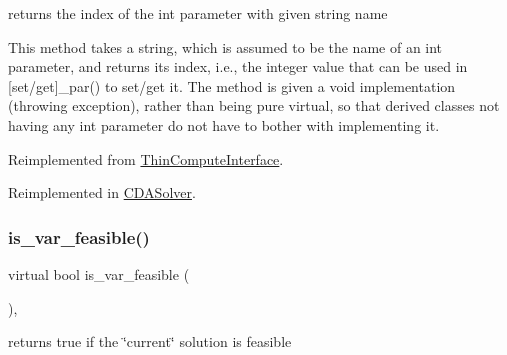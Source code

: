 returns the index of the int parameter with given string name 

This method takes a string, which is assumed to be the name of an int parameter, and returns its index, i.\+e., the integer value that can be used in \mbox{[}set/get\mbox{]}\+\_\+par() to set/get it. The method is given a void implementation (throwing exception), rather than being pure virtual, so that derived classes not having any int parameter do not have to bother with implementing it. 

Reimplemented from \mbox{\hyperlink{class_s_m_spp__di__unipi__it_1_1_thin_compute_interface_a69c6857c4288135135e8b6bbcf24252a}{Thin\+Compute\+Interface}}.



Reimplemented in \mbox{\hyperlink{class_s_m_spp__di__unipi__it_1_1_c_d_a_solver_ae281b6699b0707a5cdc1e82b76d26c09}{C\+D\+A\+Solver}}.

\mbox{\label{class_s_m_spp__di__unipi__it_1_1_solver_a038fa1e554e91724e1ce3f593aba55fd}} 
\subsubsection{\texorpdfstring{is\+\_\+var\+\_\+feasible()}{is\_var\_feasible()}}
{\footnotesize\ttfamily virtual bool is\+\_\+var\+\_\+feasible (\begin{DoxyParamCaption}\item[{void}]{ }\end{DoxyParamCaption})\hspace{0.3cm}{\ttfamily [inline]}, {\ttfamily [virtual]}}



returns true if the \char`\"{}current\char`\"{} solution is feasible 

